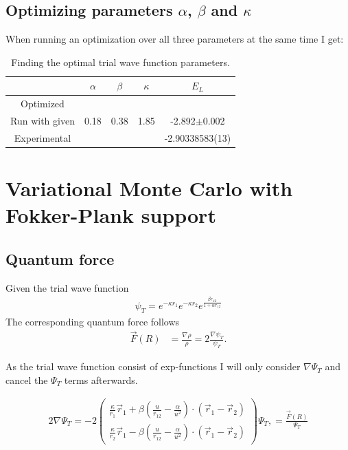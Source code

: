 \documentclass[
	a4paper, %
	10pt, %
]{CSUniSchoolLabReport}
\begin{document}
\subsection{Optimizing parameters $\alpha$, $\beta$ and $\kappa$}

When running an optimization over all three parameters at the same time I get:

\begin{table}[H]
	\centering
	\begin{tabular}{|c|c|c|c|c|} 
	\hline
		& $\alpha$ & $\beta$ & $\kappa$ & $E_L$ \\
	\hline
		Optimized &  &  &  &  \\ 
	 	Run with given & 0.18 & 0.38 & 1.85 & -2.892$\pm$0.002 \\
	\hline 
		Experimental &  &  &  & -2.90338583(13) \\ 
	\hline
\end{tabular}
	\caption{Finding the optimal trial wave function parameters.}
	\label{tab:optimparams}
\end{table}

\section{Variational Monte Carlo with Fokker-Plank support}

\subsection{Quantum force}

Given the trial wave function 
\begin{align*}
	\psi_T = e^{-\kappa r_1}e^{-\kappa r_2}e^{\frac{\beta r_{12}}{1+\alpha r_{12}}}
\end{align*}
The corresponding quantum force follows
\begin{align*}
	\Vec F (R) &=  \frac{\nabla \rho}{\rho} = 2\frac{\nabla \psi_T}{\psi_T}.
\end{align*}

As the trial wave function consist of exp-functions I will only consider $\nabla \Psi_T$ and cancel the $\Psi_T$ terms afterwards.

\begin{align*}
	2 \nabla \Psi_{T} = -2 \left (
	\begin{matrix}
		\frac{\kappa}{r_1} \Vec{r}_1 + \beta (\frac{u}{r_{12}} - \frac{\alpha}{u^2}) \cdot (\Vec r_1- \Vec r_2) \\
		\frac{\kappa}{r_2} \Vec{r}_1 - \beta (\frac{u}{r_{12}} - \frac{\alpha}{u^2}) \cdot (\Vec r_1- \Vec r_2)
	\end{matrix} \right ) \Psi_T, = \frac{\Vec F (R)}{\Psi_T}
\end{align*}
\end{document}
